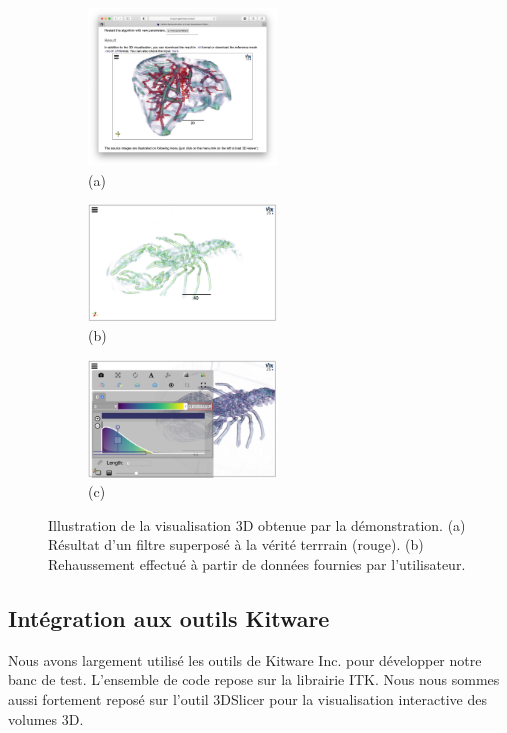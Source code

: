 \begin{figure}[!t]
\noindent   
\centering
    \begin{subfigure}{0.33\textwidth}
        \includegraphics[width=5cm, trim= 4.7cm 5cm 4.7cm 8.5cm, clip=true]{Images/visuDemoViewer.png}
        \caption{(a)}
    \end{subfigure}
    \begin{subfigure}{0.33\textwidth}
        \includegraphics[width=5cm]{Images/visuDemoViewerExtract.png}
        \caption{(b)}
    \end{subfigure}
    \begin{subfigure}{0.33\textwidth}
        \includegraphics[width=5cm]{Images/visuDemoViewerExtract2.png}
        \caption{(c)}
    \end{subfigure}

  \caption{Illustration de la visualisation 3D obtenue par la démonstration. (a) Résultat d'un filtre superposé à la vérité terrrain (rouge). (b) Rehaussement effectué à partir de données fournies par l'utilisateur. }
\label{Fig:Illustr3D}
\end{figure}

\subsection{Intégration aux outils Kitware}

Nous avons largement utilisé les outils de Kitware Inc. pour développer notre banc de test. L'ensemble de code repose sur la librairie ITK. Nous nous sommes aussi fortement reposé sur l'outil 3DSlicer pour la visualisation interactive des volumes 3D.


